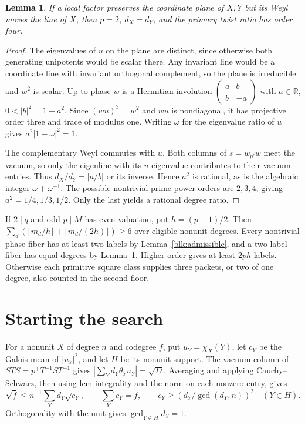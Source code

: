 \documentclass[11pt]{amsart}
\numberwithin{equation}{section}
\newtheorem{lemma}[theorem]{Lemma}
\begin{document}
\begin{lemma}\label{blk:two}
If a local factor preserves the coordinate plane of $X,Y$ but its Weyl
moves the line of $X$, then $p=2$, $d_X=d_Y$, and the primary twist ratio
has order four.
\end{lemma}
\begin{proof}
The eigenvalues of $u$ on the plane are distinct, since otherwise both
generating unipotents would be scalar there. Any invariant line would
be a coordinate line with invariant orthogonal complement, so the plane
is irreducible and $w^2$ is scalar. Up to phase $w$ is a Hermitian
involution $\left(\begin{smallmatrix}a&b\\\bar b&-a\end{smallmatrix}\right)$
with $a\in\mathbb R$, $0<|b|^2=1-a^2$. Since $(wu)^3=w^2$ and $wu$ is
nondiagonal, it has projective order three and trace of modulus one.
Writing $\omega$ for the eigenvalue ratio of $u$ gives $a^2|1-\omega|^2=1$.

The complementary Weyl commutes with $u$. Both columns of $s=w_{p'}w$
meet the vacuum, so only the eigenline with its $u$-eigenvalue contributes
to their vacuum entries. Thus $d_X/d_Y=|a/b|$ or its inverse. Hence $a^2$
is rational, as is the algebraic integer $\omega+\omega^{-1}$. The possible
nontrivial prime-power orders are $2,3,4$, giving $a^2=1/4,1/3,1/2$.
Only the last yields a rational degree ratio.
\end{proof}

If $2\mid q$ and odd $p\mid M$ has even valuation, put $h=(p-1)/2$.
Then $\sum_d(\lfloor m_d/h\rfloor+\lfloor m_d/(2h)\rfloor)\ge6$ over
eligible nonunit degrees. Every nontrivial phase fiber has at least two
labels by Lemma~\ref{blk:admissible}, and a two-label fiber has equal
degrees by Lemma~\ref{blk:two}. Higher order gives at least $2ph$ labels.
Otherwise each primitive square class supplies three packets, or two
of one degree, also counted in the second floor.

\section{Starting the search}\label{sec:small}
For a nonunit $X$ of degree $n$ and codegree $f$, put $u_Y=\chi_X(Y)$,
let $c_Y$ be the Galois mean of $|u_Y|^2$, and let $H$ be its nonunit
support. The vacuum column of $STS=p^+T^{-1}ST^{-1}$ gives
$|\sum_Yd_Y\theta_Yu_Y|=\sqrt D$. Averaging and applying Cauchy--Schwarz,
then using lcm integrality and the norm on each nonzero entry, gives
\begin{equation}\label{st}
 \sqrt f\le n^{-1}\sum_Yd_Y\sqrt{c_Y},\qquad
 \sum_Yc_Y=f,\qquad c_Y\ge(d_Y/\gcd(d_Y,n))^2\quad(Y\in H).
\end{equation}
Orthogonality with the unit gives $\gcd_{Y\in H}d_Y=1$.
\end{document}
